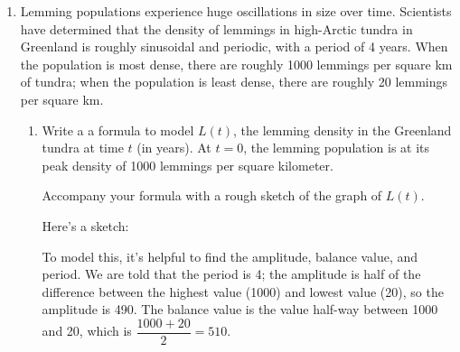 \documentclass{article}
\begin{document}
\begin{enumerate}
\pspace{\newpage}


\item
  \label{spring2011-midterm1-2-expanded} \label{spring2011-midterm1-lemmings}

  Lemming populations experience huge oscillations in size over time.
  Scientists have determined that the density of lemmings in high-Arctic
  tundra in Greenland is roughly sinusoidal and periodic, with a period
  of 4 years.  When the population is most dense, there are roughly 1000
  lemmings per square km of tundra; when the population is least dense,
  there are roughly 20 lemmings per square km.

  \begin{enumerate}
  \item 
    \begin{problem}[\stretch{3}]      
      Write a a formula to model $L(t)$, the lemming density in the
      Greenland tundra at time $t$ (in years). At $t = 0$, the lemming population is at its peak density
      of 1000 lemmings per square kilometer.

      Accompany your formula with a rough sketch of the graph of $L(t)$.
    \end{problem}

    \begin{solution}
      Here's a sketch:
      \begin{center}
      \end{center}    
      To model this, it's helpful to find the amplitude, balance value, and
      period.  We are told that the period is 4; the amplitude is half of
      the difference between the highest value (1000) and lowest value (20),
      so the amplitude is 490.  The balance value is the value half-way
      between 1000 and 20, which is $\dfrac{1000 + 20}{2} = 510$.



\end{solution}
\end{enumerate}
\end{enumerate}
\end{document}
